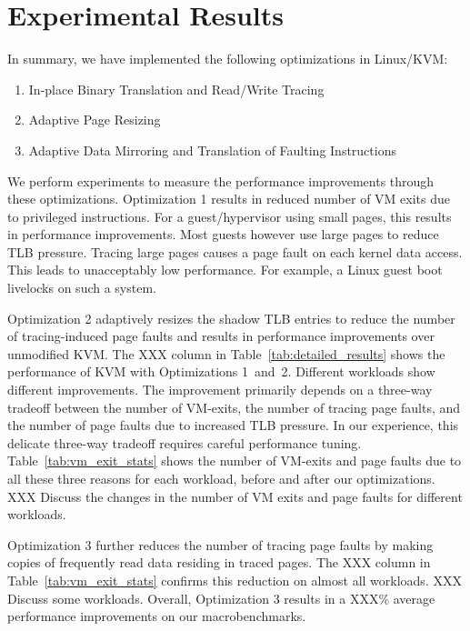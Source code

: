 \documentclass[10pt,twocolumn]{article}
\begin{document}
\section{Experimental Results}
\label{sec:results}
In summary, we have implemented the following optimizations in Linux/KVM:
\begin{enumerate}
  \item In-place Binary Translation and Read/Write Tracing
  \item Adaptive Page Resizing
  \item Adaptive Data Mirroring and Translation of Faulting Instructions
\end{enumerate}
We perform experiments to measure the performance improvements through these
optimizations. Optimization 1 results in reduced number of VM exits due
to privileged instructions. For a guest/hypervisor using small pages, this results
in performance improvements. Most guests however use large pages to reduce
TLB pressure. Tracing large pages causes a page fault on each kernel data access.
This leads to unacceptably low performance. For example, a Linux guest boot livelocks
on such a system.

Optimization 2 adaptively resizes the shadow TLB entries to reduce
the number of tracing-induced page faults and results in
performance improvements over unmodified KVM. The XXX column
in Table~\ref{tab:detailed_results} shows the performance of KVM with
Optimizations 1~and~2.
Different workloads show different improvements. The improvement primarily depends
on a three-way tradeoff between the number of VM-exits, the number of
tracing page faults, and the number of page faults due to increased TLB pressure.
In our experience, this delicate three-way tradeoff requires careful
performance tuning.
Table~\ref{tab:vm_exit_stats} shows the number of VM-exits and page faults due
to all these three reasons for each workload, before and after our optimizations.
XXX Discuss the changes in the number
of VM exits and page faults for different workloads.

Optimization 3 further reduces the number of tracing page faults by
making copies of frequently read data residing in traced pages. The XXX column in
Table~\ref{tab:vm_exit_stats} confirms this reduction on almost all workloads.
XXX Discuss some workloads. Overall,
Optimization 3 results in a XXX\% average performance
improvements on our macrobenchmarks.
\end{document}
